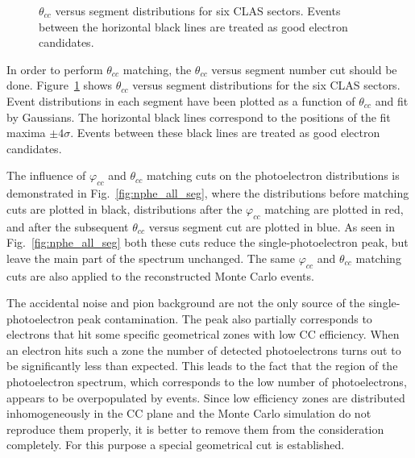\begin{figure}[htp]
\begin{center}
\caption{\small  $\theta_{cc}$ versus segment distributions for six CLAS sectors. Events between the horizontal black lines are treated as good electron candidates.} \label{fig:th_vs_seg}
\end{center}
\end{figure}%

In order to perform $\theta_{cc}$ matching, the $\theta_{cc}$ versus segment number cut should be done. Figure~\ref{fig:th_vs_seg} shows $\theta_{cc}$ versus segment distributions for the six CLAS sectors. Event distributions in each segment have been plotted as a function of $\theta_{cc}$ and fit by Gaussians. The horizontal black lines correspond to the positions of the fit maxima $\pm4\sigma$. Events between these black lines are treated as good electron candidates.


The influence of $\varphi_{cc}$ and $\theta_{cc}$ matching cuts on the photoelectron distributions is demonstrated in Fig.~\ref{fig:nphe_all_seg}, where the distributions before matching cuts are plotted in black, distributions after the $\varphi_{cc}$ matching are plotted in red, and after the subsequent $\theta_{cc}$ versus segment cut are plotted in blue. As seen in Fig.~\ref{fig:nphe_all_seg} both these cuts reduce the single-photoelectron peak, but leave the main part of the spectrum unchanged. The same $\varphi_{cc}$ and $\theta_{cc}$ matching cuts are also applied to the reconstructed Monte Carlo events.


The accidental noise and pion background are not the only source of the single-photoelectron peak contamination. The peak also partially corresponds to electrons that hit some specific geometrical zones with low CC efficiency. When an electron hits such a zone the number of detected photoelectrons turns out to be significantly less than expected. This leads to the fact that the region of the photoelectron spectrum, which corresponds to the low number of photoelectrons, appears to be overpopulated by events. Since low efficiency zones are distributed inhomogeneously in the CC plane and the Monte Carlo simulation do not reproduce them properly, it is better to remove them from the consideration completely. For this purpose  a special geometrical cut is established. 


